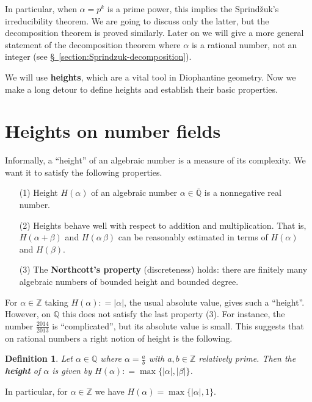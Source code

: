 \documentclass{article}
\newcommand{\term}{\textbf}
\newcommand{\dfn}{\mathrel{\mathop:}=}
\newcommand{\ZZ}{\mathbb{Z}}
\newcommand{\QQ}{\mathbb{Q}}
\newcommand{\refref}[2]{\hyperref[#2]{#1~\ref*{#2}}}
\theoremstyle{myplain}
\theoremstyle{mydefinition}
\newtheorem{definition}[proposition]{Definition}
\begin{document}
In particular, when $\alpha = p^k$ is a prime power, this implies the
Sprind\v{z}uk's irreducibility theorem. We are going to discuss only the latter,
but the decomposition theorem is proved similarly. Later on we will give a more
general statement of the decomposition theorem where $\alpha$ is a rational
number, not an integer (see \refref{\S}{section:Sprindzuk-decomposition}).

We will use \term{heights}, which are a vital tool in Diophantine geometry. Now
we make a long detour to define heights and establish their basic properties.

\section{Heights on number fields}

Informally, a ``height'' of an algebraic number is a measure of its
complexity. We want it to satisfy the following properties.

\begin{enumerate}
\item[(1)] Height $H (\alpha)$ of an algebraic number
  $\alpha \in \overline{\QQ}$ is a nonnegative real number.

\item[(2)] Heights behave well with respect to addition and multiplication. That
  is, $H (\alpha + \beta)$ and $H (\alpha\,\beta)$ can be reasonably estimated
  in terms of $H (\alpha)$ and $H (\beta)$.

\item[(3)] The \term{Northcott's property} (discreteness) holds: there are
  finitely many algebraic numbers of bounded height and bounded degree.
\end{enumerate}

For $\alpha \in \ZZ$ taking $H (\alpha) \dfn |\alpha|$, the usual absolute
value, gives such a ``height''. However, on $\QQ$ this does not satisfy the last
property (3). For instance, the number $\frac{2014}{2013}$ is ``complicated'',
but its absolute value is small. This suggests that on rational numbers a right
notion of height is the following.

\begin{definition}
  Let $\alpha \in \QQ$ where $\alpha = \frac{a}{b}$ with $a, b \in \ZZ$
  relatively prime. Then the \term{height} of $\alpha$ is given by
  $H (\alpha) \dfn \max \{ |\alpha|, |\beta| \}$.
\end{definition}

In particular, for $\alpha \in \ZZ$ we have
$H (\alpha) = \max \{ |\alpha|, 1 \}$.
\end{document}
